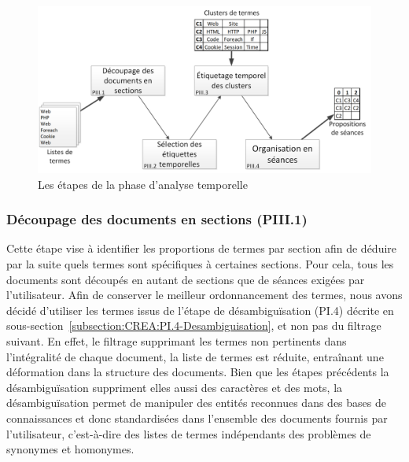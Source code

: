 \begin{figure}[ht]
\centering
\centerline{  %
\includegraphics[scale=0.7]{5-Conclusion/images/schema_analyse_temporelle_ESCALIER_2.png}
}
\caption{Les étapes de la phase d'analyse temporelle}
\label{figure:5-III-AnalyseTemporelle}
\end{figure}

\vfill
\hspace{0pt}

\newpage

\subsubsection{Découpage des documents en sections (PIII.1)}
\label{subsubsection:Conclusion:PerspectivesAmeliorations:AnalyseTemporelle:DecoupageDocuments}

Cette étape vise à identifier les proportions de termes par section afin de déduire par la suite quels termes sont spécifiques à certaines sections.
Pour cela, tous les documents sont découpés en autant de sections que de séances exigées par l'utilisateur.
Afin de conserver le meilleur ordonnancement des termes, nous avons décidé d'utiliser les termes issus de l'étape de désambiguïsation (PI.4) décrite en sous-section~\ref{subsection:CREA:PI.4-Desambiguisation}, et non pas du filtrage suivant.
En effet, le filtrage supprimant les termes non pertinents dans l'intégralité de chaque document, la liste de termes est réduite, entraînant une déformation dans la structure des documents.
Bien que les étapes précédents la désambiguïsation suppriment elles aussi des caractères et des mots, la désambiguïsation permet de manipuler des entités reconnues dans des bases de connaissances et donc standardisées dans l'ensemble des documents fournis par l'utilisateur, c'est-à-dire des listes de termes indépendants des problèmes de synonymes et homonymes.

